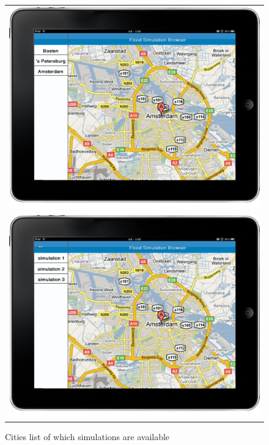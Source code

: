 \begin{figure}[ht]
\center
\begin{tabular}{c}
	\includegraphics[scale=0.2]{mockup1.png} \\
	\includegraphics[scale=0.2]{mockup2.png}
\end{tabular}
\label{fig:mockup}
\caption{Cities list of which simulations are available}
\end{figure}

